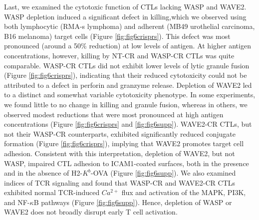 Last, we examined the cytotoxic function of CTLs lacking WASP and WAVE2. WASP depletion induced a significant defect in killing,which we observed using both lymphocytic (RMA-s lymphoma) and adherent (MB49 urothelial carcinoma, B16 melanoma) target cells (Figure \ref{fig:fig6crisprs}). This defect was most pronounced (around a 50\% reduction) at low levels of antigen. At higher antigen concentrations, however, killing by NT-CR and WASP-CR CTLs was quite comparable. WASP-CR CTLs did not exhibit lower levels of lytic granule fusion (Figure \ref{fig:fig6crisprs}), indicating that their reduced cytotoxicity could not be attributed to a defect in perforin and granzyme release. Depletion of WAVE2 led to a distinct and somewhat variable cytotoxicity phenotype. In some experiments, we found little to no change in killing and granule fusion, whereas in others, we observed modest reductions that were most pronounced at high antigen concentrations (Figure \ref{fig:fig6crisprs} and \ref{fig:fig6supp}). WAVE2-CR CTLs, but not their WASP-CR counterparts, exhibited significantly reduced conjugate formation (Figure \ref{fig:fig6crisprs}), implying that WAVE2 promotes target cell adhesion. Consistent with this interpretation, depletion of WAVE2, but not WASP, impaired CTL adhesion to ICAM1-coated surfaces, both in the presence and in the absence of H2-$K^{b}$-OVA (Figure \ref{fig:fig6supp}). We also examined indices of TCR signaling and found that WASP-CR and WAVE2-CR CTLs exhibited normal TCR-induced $Ca^{2+}$ flux and activation of the MAPK, PI3K, and NF-$\kappa$B pathways (Figure \ref{fig:fig6supp}). Hence, depletion of WASP or WAVE2 does not broadly disrupt early T cell activation. 


